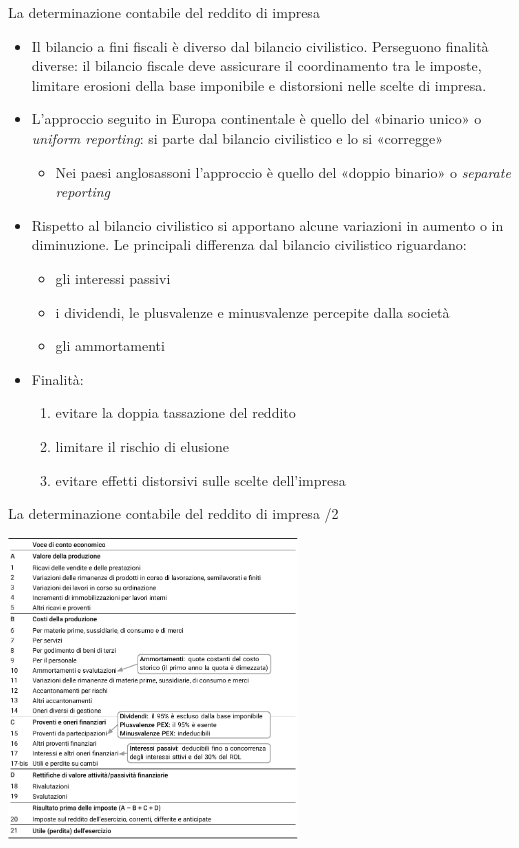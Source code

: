 \documentclass[11pt,italian]{beamer}
\begin{document}
\begin{frame}{La determinazione contabile del reddito di impresa}
\begin{itemize}
\item Il bilancio a fini fiscali è diverso dal bilancio civilistico.
Perseguono finalità diverse: il bilancio fiscale deve assicurare il
coordinamento tra le imposte, limitare erosioni della base imponibile e
distorsioni nelle scelte di impresa.
\item L'approccio seguito in Europa continentale è quello del «binario unico» o
\emph{uniform reporting}: si parte dal bilancio civilistico e lo si «corregge»
\begin{itemize}
\item Nei paesi anglosassoni l'approccio è quello del «doppio binario» o
\emph{separate reporting}
\end{itemize}
\item Rispetto al bilancio civilistico si apportano alcune variazioni in aumento o
in diminuzione. Le principali differenza dal bilancio civilistico
riguardano:
\begin{itemize}
\item gli interessi passivi
\item i dividendi, le plusvalenze e minusvalenze percepite dalla società
\item gli ammortamenti
\end{itemize}
\item Finalità:
\begin{enumerate}
\item evitare la doppia tassazione del reddito
\item limitare il rischio di elusione
\item evitare effetti distorsivi sulle scelte dell'impresa
\end{enumerate}
\end{itemize}
\end{frame}


\begin{frame}{La determinazione contabile del reddito di impresa /2}
\begin{center}
\centering
\includegraphics[height=8cm]{./figure/tabella-conto-economico.pdf}
\end{center}
\end{frame}
\end{document}
